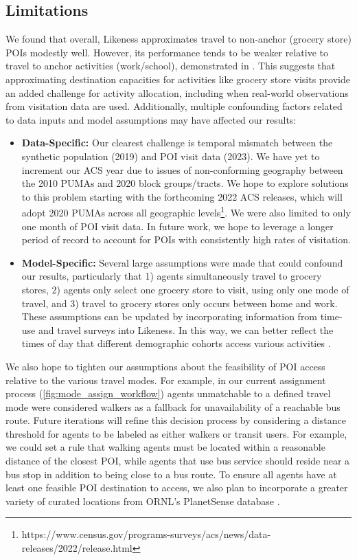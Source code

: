 \subsection{Limitations}\label{section:limitations}

We found that overall, Likeness approximates travel to non-anchor (grocery store) POIs modestly well. However, its performance tends to be weaker relative to travel to anchor activities (work/school), demonstrated in \cite{likeness-scipy-paper-2022}. This suggests that approximating destination capacities for activities like grocery store visits provide an added challenge for activity allocation, including when real-world observations from visitation data are used. Additionally, multiple confounding factors related to data inputs and model assumptions may have affected our results:

\begin{itemize}
    \item \textbf{Data-Specific:} Our clearest challenge is temporal mismatch between the synthetic population (2019) and POI visit data (2023). We have yet to increment our ACS year due to issues of non-conforming geography between the 2010 PUMAs and 2020 block groups/tracts. We hope to explore solutions to this problem starting with the forthcoming 2022 ACS releases, which will adopt 2020 PUMAs across all geographic levels\footnote{https://www.census.gov/programs-surveys/acs/news/data-releases/2022/release.html}. We were also limited to only one month of POI visit data. In future work, we hope to leverage a longer period of record to account for POIs with consistently high rates of visitation.
    \item \textbf{Model-Specific:} Several large assumptions were made that could confound our results, particularly that 1) agents simultaneously travel to grocery stores, 2) agents only select one grocery store to visit, using only one mode of travel, and 3) travel to grocery stores only occurs between home and work. These assumptions can be updated by incorporating information from time-use and travel surveys into Likeness. In this way, we can better reflect the times of day that different demographic cohorts access various activities \cite{macal2018chisim}.
\end{itemize}

We also hope to tighten our assumptions about the feasibility of POI access relative to the various travel modes. For example, in our current assignment process (\autoref{fig:mode_assign_workflow}) agents unmatchable to a defined travel mode were considered walkers as a fallback for unavailability of a reachable bus route. Future iterations will refine this decision process by considering a distance threshold for agents to be labeled as either walkers or transit users. For example, we could set a rule that walking agents must be located within a reasonable distance of the closest POI, while agents that use bus service should reside near a bus stop in addition to being close to a bus route. To ensure all agents have at least one feasible POI destination to access, we also plan to incorporate a greater variety of curated locations from ORNL's PlanetSense database \cite{thakur2015planetsense}.


